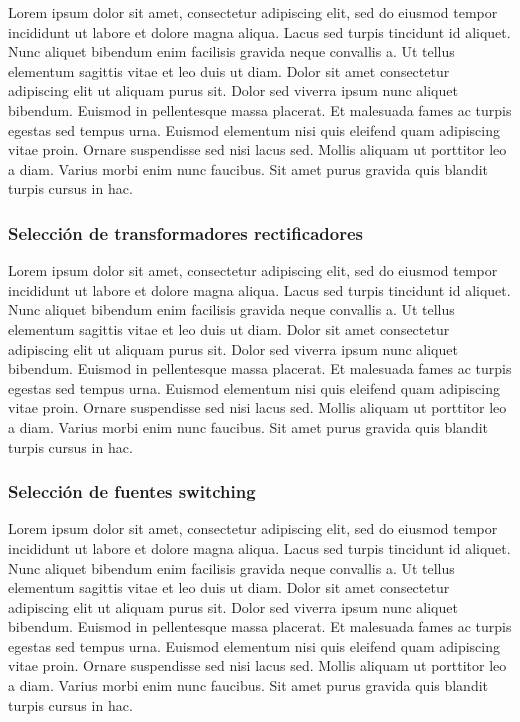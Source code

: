 Lorem ipsum dolor sit amet, consectetur adipiscing elit, sed do eiusmod tempor incididunt ut labore et dolore magna aliqua. Lacus sed turpis tincidunt id aliquet. Nunc aliquet bibendum enim facilisis gravida neque convallis a. Ut tellus elementum sagittis vitae et leo duis ut diam. Dolor sit amet consectetur adipiscing elit ut aliquam purus sit. Dolor sed viverra ipsum nunc aliquet bibendum. Euismod in pellentesque massa placerat. Et malesuada fames ac turpis egestas sed tempus urna. Euismod elementum nisi quis eleifend quam adipiscing vitae proin. Ornare suspendisse sed nisi lacus sed. Mollis aliquam ut porttitor leo a diam. Varius morbi enim nunc faucibus. Sit amet purus gravida quis blandit turpis cursus in hac.

\subsubsection{Selección de transformadores rectificadores}

Lorem ipsum dolor sit amet, consectetur adipiscing elit, sed do eiusmod tempor incididunt ut labore et dolore magna aliqua. Lacus sed turpis tincidunt id aliquet. Nunc aliquet bibendum enim facilisis gravida neque convallis a. Ut tellus elementum sagittis vitae et leo duis ut diam. Dolor sit amet consectetur adipiscing elit ut aliquam purus sit. Dolor sed viverra ipsum nunc aliquet bibendum. Euismod in pellentesque massa placerat. Et malesuada fames ac turpis egestas sed tempus urna. Euismod elementum nisi quis eleifend quam adipiscing vitae proin. Ornare suspendisse sed nisi lacus sed. Mollis aliquam ut porttitor leo a diam. Varius morbi enim nunc faucibus. Sit amet purus gravida quis blandit turpis cursus in hac.

\subsubsection{Selección de fuentes switching}

Lorem ipsum dolor sit amet, consectetur adipiscing elit, sed do eiusmod tempor incididunt ut labore et dolore magna aliqua. Lacus sed turpis tincidunt id aliquet. Nunc aliquet bibendum enim facilisis gravida neque convallis a. Ut tellus elementum sagittis vitae et leo duis ut diam. Dolor sit amet consectetur adipiscing elit ut aliquam purus sit. Dolor sed viverra ipsum nunc aliquet bibendum. Euismod in pellentesque massa placerat. Et malesuada fames ac turpis egestas sed tempus urna. Euismod elementum nisi quis eleifend quam adipiscing vitae proin. Ornare suspendisse sed nisi lacus sed. Mollis aliquam ut porttitor leo a diam. Varius morbi enim nunc faucibus. Sit amet purus gravida quis blandit turpis cursus in hac.


